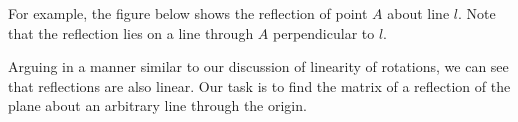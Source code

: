 \documentclass{ximera}
\begin{document}
For example, the figure below shows the reflection of point $A$ about line $l$.  Note that the reflection lies on a line through $A$ perpendicular to $l$.

\begin{center}
    \end{center}
 
    Arguing in a manner similar to our discussion of linearity of rotations, we can see that reflections are also linear.  Our task is to find the matrix of a reflection of the plane about an arbitrary line through the origin.
  
\end{document}
